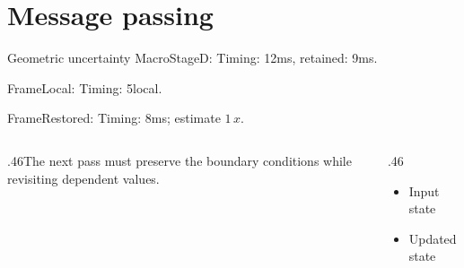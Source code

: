 \documentclass[11pt,aspectratio=43]{beamer}
\newcommand{\fuzzlayerA}[1]{\textrm{#1}}
\newcommand{\fuzzlayerB}[1]{\fuzzlayerA{#1}}
\newcommand{\fuzzterm}[1]{\fuzzlayerB{#1}}
\newcommand{\fuzzpair}[2]{\fuzzterm{#1}: #2}
\newcommand{\fuzzunit}{ms}
\let\fuzzoriginalunit\fuzzunit
\newcommand{\fuzzcoefficient}{1}
\newcommand{\fuzzscale}[2][\fuzzcoefficient]{#1\,#2}
\begin{document}
\section{Message passing}
\begin{frame}[t]{Geometric uncertainty}
\fuzzpair{MacroStageD}{Timing: 12\fuzzunit, retained: 9\fuzzoriginalunit.}\par
{\renewcommand{\fuzzunit}{local}\fuzzpair{FrameLocal}{Timing: 5\fuzzunit.}\par}
\fuzzpair{FrameRestored}{Timing: 8\fuzzunit; estimate $\fuzzscale{x}$.}\par
\begin{columns}[T]\begin{column}{.46\textwidth}The next pass must preserve the boundary conditions while revisiting dependent values.\end{column}\begin{column}{.46\textwidth}\begin{itemize}\item Input state\item Updated state\end{itemize}\end{column}\end{columns}
\end{frame}
\end{document}
